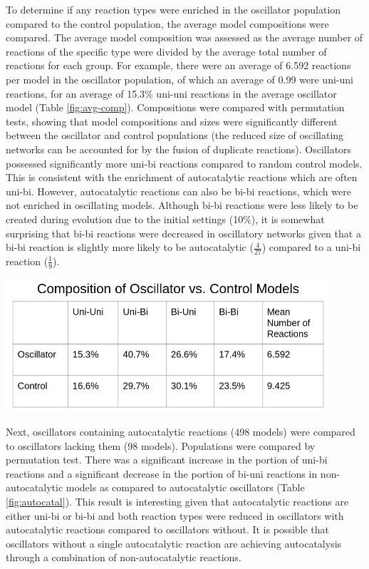 \documentclass[12pt]{report}
\begin{document}
To determine if any reaction types were enriched in the oscillator population compared to the control population, the average model compositions were compared. The average model composition was assessed as the average number of reactions of the specific type were divided by the average total number of reactions for each group. For example, there were an average of 6.592 reactions per model in the oscillator population, of which an average of 0.99 were uni-uni reactions, for an average of 15.3\% uni-uni reactions in the average oscillator model (Table \ref{fig:avg-comp}). Compositions were compared with permutation tests, showing that model compositions and sizes were significantly different between the oscillator and control populations (the reduced size of oscillating networks can be accounted for by the fusion of duplicate reactions). Oscillators possessed significantly more uni-bi reactions compared to random control models. This is consistent with the enrichment of autocatalytic reactions which are often uni-bi. However, autocatalytic reactions can also be bi-bi reactions, which were not enriched in oscillating models. Although bi-bi reactions were less likely to be created during evolution due to the initial settings (10\%), it is somewhat surprising that bi-bi reactions were decreased in oscillatory networks given that a bi-bi reaction is slightly more likely to be autocatalytic ($\frac{4}{27}$) compared to a uni-bi reaction ($\frac{1}{9}$).

\begin{center}
    \includegraphics[width=12cm]{images/composition.png}
    \label{fig:avg-comp}
\end{center}

Next, oscillators containing autocatalytic reactions (498 models) were compared to oscillators lacking them (98 models). Populations were compared by permutation test. There was a significant increase in the portion of uni-bi reactions and a significant decrease in the portion of bi-uni reactions in non-autocatalytic models as compared to autocatalytic oscillators (Table \ref{fig:autocatal}). This result is interesting given that autocatalytic reactions are either uni-bi or bi-bi and both reaction types were reduced in oscillators with autocatalytic reactions compared to oscillators without. It is possible that oscillators without a single autocatalytic reaction are achieving autocatalysis through a combination of non-autocatalytic reactions.
\end{document}
